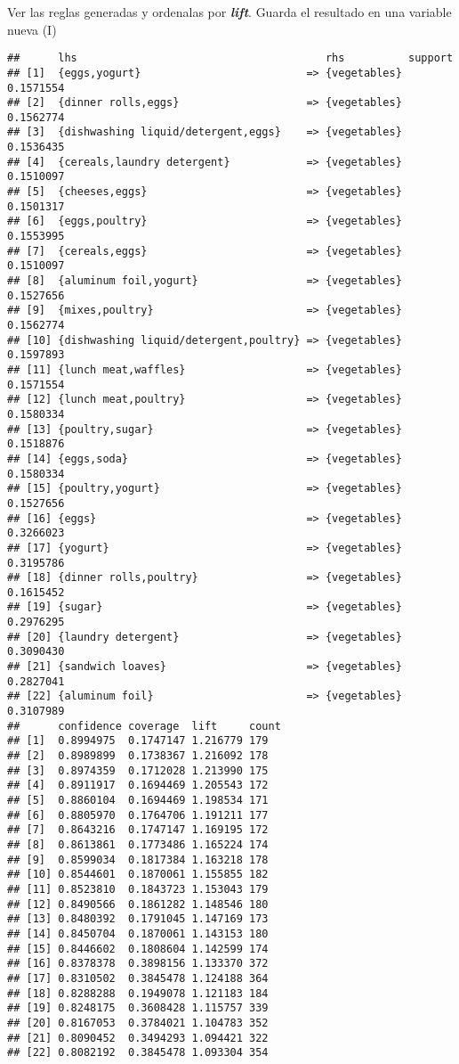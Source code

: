 \documentclass[
  ignorenonframetext,
]{beamer}
\begin{document}
\begin{frame}[fragile]{Ver las reglas generadas y ordenalas por
\textbf{\emph{lift}}. Guarda el resultado en una variable nueva (I)}
\begin{verbatim}
##      lhs                                       rhs          support  
## [1]  {eggs,yogurt}                          => {vegetables} 0.1571554
## [2]  {dinner rolls,eggs}                    => {vegetables} 0.1562774
## [3]  {dishwashing liquid/detergent,eggs}    => {vegetables} 0.1536435
## [4]  {cereals,laundry detergent}            => {vegetables} 0.1510097
## [5]  {cheeses,eggs}                         => {vegetables} 0.1501317
## [6]  {eggs,poultry}                         => {vegetables} 0.1553995
## [7]  {cereals,eggs}                         => {vegetables} 0.1510097
## [8]  {aluminum foil,yogurt}                 => {vegetables} 0.1527656
## [9]  {mixes,poultry}                        => {vegetables} 0.1562774
## [10] {dishwashing liquid/detergent,poultry} => {vegetables} 0.1597893
## [11] {lunch meat,waffles}                   => {vegetables} 0.1571554
## [12] {lunch meat,poultry}                   => {vegetables} 0.1580334
## [13] {poultry,sugar}                        => {vegetables} 0.1518876
## [14] {eggs,soda}                            => {vegetables} 0.1580334
## [15] {poultry,yogurt}                       => {vegetables} 0.1527656
## [16] {eggs}                                 => {vegetables} 0.3266023
## [17] {yogurt}                               => {vegetables} 0.3195786
## [18] {dinner rolls,poultry}                 => {vegetables} 0.1615452
## [19] {sugar}                                => {vegetables} 0.2976295
## [20] {laundry detergent}                    => {vegetables} 0.3090430
## [21] {sandwich loaves}                      => {vegetables} 0.2827041
## [22] {aluminum foil}                        => {vegetables} 0.3107989
##      confidence coverage  lift     count
## [1]  0.8994975  0.1747147 1.216779 179  
## [2]  0.8989899  0.1738367 1.216092 178  
## [3]  0.8974359  0.1712028 1.213990 175  
## [4]  0.8911917  0.1694469 1.205543 172  
## [5]  0.8860104  0.1694469 1.198534 171  
## [6]  0.8805970  0.1764706 1.191211 177  
## [7]  0.8643216  0.1747147 1.169195 172  
## [8]  0.8613861  0.1773486 1.165224 174  
## [9]  0.8599034  0.1817384 1.163218 178  
## [10] 0.8544601  0.1870061 1.155855 182  
## [11] 0.8523810  0.1843723 1.153043 179  
## [12] 0.8490566  0.1861282 1.148546 180  
## [13] 0.8480392  0.1791045 1.147169 173  
## [14] 0.8450704  0.1870061 1.143153 180  
## [15] 0.8446602  0.1808604 1.142599 174  
## [16] 0.8378378  0.3898156 1.133370 372  
## [17] 0.8310502  0.3845478 1.124188 364  
## [18] 0.8288288  0.1949078 1.121183 184  
## [19] 0.8248175  0.3608428 1.115757 339  
## [20] 0.8167053  0.3784021 1.104783 352  
## [21] 0.8090452  0.3494293 1.094421 322  
## [22] 0.8082192  0.3845478 1.093304 354
\end{verbatim}

\end{frame}
\end{document}
